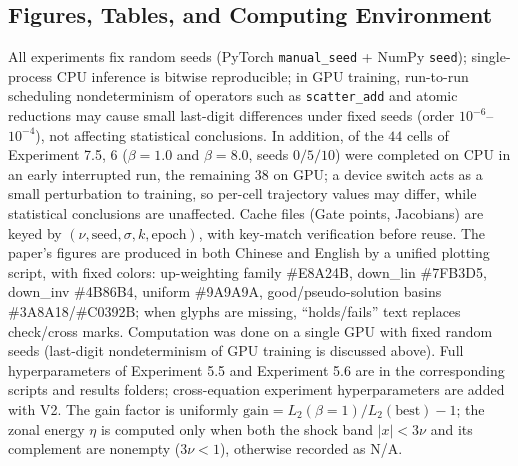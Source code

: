\documentclass[11pt]{article}
\numberwithin{equation}{section}
\begin{document}
\subsection{Figures, Tables, and Computing Environment}
All experiments fix random seeds (PyTorch \texttt{manual\_\hspace{0pt}seed} + NumPy \texttt{seed}); single-process CPU inference is bitwise reproducible; in GPU training, run-to-run scheduling nondeterminism of operators such as \texttt{scatter\_\hspace{0pt}add} and atomic reductions may cause small last-digit differences under fixed seeds (order $10^{-6}$--$10^{-4}$), not affecting statistical conclusions. In addition, of the $44$ cells of Experiment 7.5, $6$ ($\beta=1.0$ and $\beta=8.0$, seeds $0/5/10$) were completed on CPU in an early interrupted run, the remaining $38$ on GPU; a device switch acts as a small perturbation to training, so per-cell trajectory values may differ, while statistical conclusions are unaffected. Cache files (Gate points, Jacobians) are keyed by $(\nu,\text{seed},\sigma,k,\text{epoch})$, with key-match verification before reuse.
The paper's figures are produced in both Chinese and English by a unified plotting script, with fixed colors: up-weighting family \#E8A24B, down\_lin \#7FB3D5, down\_inv \#4B86B4, uniform \#9A9A9A, good/pseudo-solution basins \#3A8A18/\#C0392B; when glyphs are missing, ``holds/fails'' text replaces check/cross marks. Computation was done on a single GPU with fixed random seeds (last-digit nondeterminism of GPU training is discussed above). Full hyperparameters of Experiment 5.5 and Experiment 5.6 are in the corresponding scripts and results folders; cross-equation experiment hyperparameters are added with V2. The gain factor is uniformly $\mathrm{gain}=L_2(\beta=1)/L_2(\mathrm{best})-1$; the zonal energy $\eta$ is computed only when both the shock band $|x|<3\nu$ and its complement are nonempty ($3\nu<1$), otherwise recorded as N/A.
\end{document}
